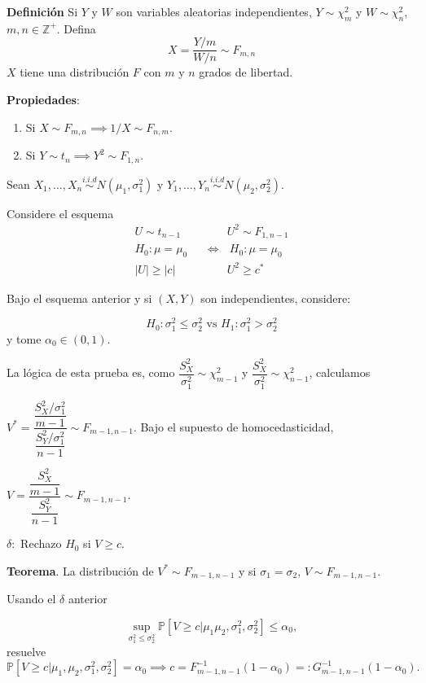 \documentclass[
  12pt,
]{book}
\begin{document}
\textbf{Definición} Si \(Y\) y \(W\) son variables aleatorias independientes, \(Y\sim \chi^2_m\) y \(W\sim \chi ^2_n\), \(m,n\in \mathbb Z^+\). Defina
\[X = \dfrac{Y/m}{W/n}\sim F_{m,n}\]
\(X\) tiene una distribución \(F\) con \(m\) y \(n\) grados de libertad.

\textbf{Propiedades}:

\begin{enumerate}
\def\labelenumi{\arabic{enumi}.}
\item
  Si \(X\sim F_{m,n} \implies 1/X\sim F_{n,m}\).
\item
  Si \(Y\sim t_n \implies Y^2\sim F_{1,n}\).
\end{enumerate}

Sean \(X_1,\dots, X_n\overset{i.i.d}{\sim} N(\mu_1,\sigma_1^2)\) y \(Y_1,\dots, Y_n\overset{i.i.d}{\sim} N(\mu_2,\sigma_2^2)\).

Considere el esquema
\begin{align*}
U\sim t_{n-1}\text{  }& \quad \quad U^2\sim F_{1,n-1}\\
H_0: \mu=\mu_0\text{  } & \Leftrightarrow \text{  }  H_0: \mu=\mu_0 \\
|U|\geq |c|\text{  } & \quad \quad  U^2\geq c^* 
\end{align*}

Bajo el esquema anterior y si \((X,Y)\) son independientes, considere:

\[H_0: \sigma_1^2\leq \sigma_2^2 \text { vs } H_1: \sigma_1^2> \sigma_2^2 \]
y tome \(\alpha_0 \in (0,1)\).

La lógica de esta prueba es, como \(\dfrac{S_X^2}{\sigma_1^2} \sim \chi^2_{m-1}\) y \(\dfrac{S_X^2}{\sigma_1^2} \sim \chi^2_{n-1}\), calculamos

\(V^* = \dfrac{\dfrac{S_X^2/\sigma_1^2}{m-1}}{\dfrac{S_Y^2/\sigma_1^2}{n-1}}\sim F_{m-1,n-1}\).
Bajo el supuesto de homocedasticidad,

\(V = \dfrac{\dfrac{S_X^2}{m-1}}{\dfrac{S_Y^2}{n-1}}\sim F_{m-1,n-1}\).

\(\delta:\) Rechazo \(H_0\) si \(V\geq c\).

\textbf{Teorema}. La distribución de \(V^*\sim F_{m-1,n-1}\) y si \(\sigma_1=\sigma_2\), \(V \sim F_{m-1,n-1}\).

Usando el \(\delta\) anterior

\[\sup_{\sigma_1^2\leq\sigma^2_2}\mathbb P[V\geq c|\mu_1\mu_2,\sigma^2_1,\sigma_2^2]\leq \alpha_0,\]
resuelve
\[\mathbb P[V\geq c|\mu_1,\mu_2,\sigma_1^2,\sigma_2^2] = \alpha_0 \implies c = F^{-1}_{m-1,n-1}(1-\alpha_0) =: G^{-1}_{m-1,n-1}(1-\alpha_0).\]
\end{document}
